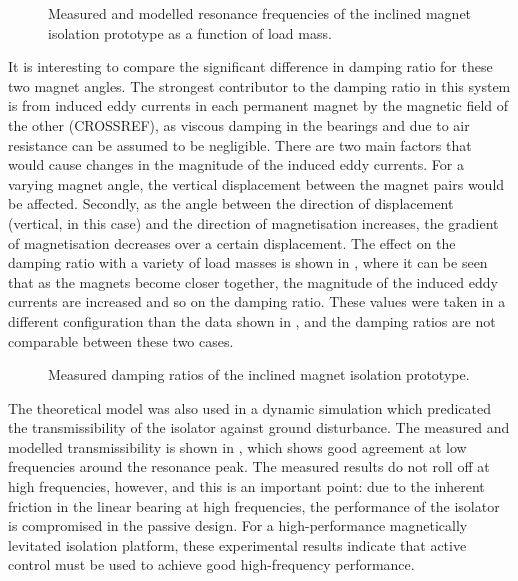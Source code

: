 \begin{figure}
\centering
{}
\caption{Measured and modelled resonance frequencies of the inclined magnet isolation prototype as a function of load mass.}
\end{figure}

It is interesting to compare the significant difference in damping ratio for these two magnet angles.
The strongest contributor to the damping ratio in this system is from induced eddy currents in each permanent magnet by the magnetic field of the other (CROSSREF), as viscous damping in the bearings and due to air resistance can be assumed to be negligible.
There are two main factors that would cause changes in the magnitude of the induced eddy currents.
For a varying magnet angle, the vertical displacement between the magnet pairs would be affected.
Secondly, as the angle between the direction of displacement (vertical, in this case) and the direction of magnetisation increases, the gradient of magnetisation decreases over a certain displacement.
The effect on the damping ratio with a variety of load masses is shown in , where it can be seen that as the magnets become closer together, the magnitude of the induced eddy currents are increased and so on the damping ratio.
These values were taken in a different configuration than the data shown in , and the damping ratios are not comparable between these two cases.

\begin{figure}
\centering
{}
\caption{Measured damping ratios of the inclined magnet isolation prototype.}
\end{figure}

The theoretical model was also used in a dynamic simulation which predicated the transmissibility of the isolator against ground disturbance.
The measured and modelled transmissibility is shown in , which shows good agreement at low frequencies around the resonance peak.
The measured results do not roll off at high frequencies, however, and this is an important point: due to the inherent friction in the linear bearing at high frequencies, the performance of the isolator is compromised in the passive design.
For a high-performance magnetically levitated isolation platform, these experimental results indicate that active control must be used to achieve good high-frequency performance.

